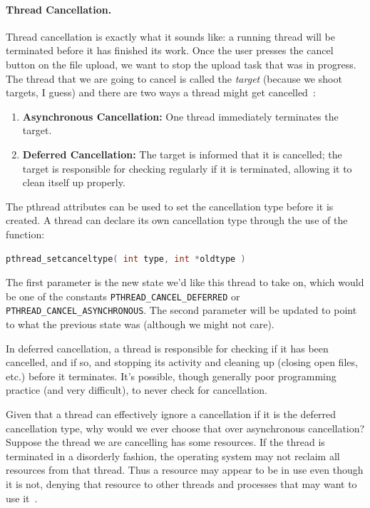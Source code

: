 \documentclass[a4paper]{report}
\begin{document}
\paragraph{Thread Cancellation.}
Thread cancellation is exactly what it sounds like: a running thread will be terminated before it has finished its work. Once the user presses the cancel button on the file upload, we want to stop the upload task that was in progress. The thread that we are going to cancel is called the \textit{target} (because we shoot targets, I guess) and there are two ways a thread might get cancelled~\cite{osc}:

\begin{enumerate}
	\item \textbf{Asynchronous Cancellation:} One thread immediately terminates the target.
	\item \textbf{Deferred Cancellation:} The target is informed that it is cancelled; the target is responsible for checking regularly if it is terminated, allowing it to clean itself up properly.
\end{enumerate}

The pthread attributes can be used to set the cancellation type before it is created. A thread can declare its own cancellation type through the use of the function:
\begin{lstlisting}[language=C]
pthread_setcanceltype( int type, int *oldtype )
\end{lstlisting}

The first parameter is the new state we'd like this thread to take on, which would be one of the constants \texttt{PTHREAD\_CANCEL\_DEFERRED} or \texttt{PTHREAD\_CANCEL\_ASYNCHRONOUS}. The second parameter will be updated to point to what the previous state was (although we might not care).

In deferred cancellation, a thread is responsible for checking if it has been cancelled, and if so, and stopping its activity and cleaning up (closing open files, etc.) before it terminates. It's possible, though generally poor programming practice (and very difficult), to never check for cancellation.

Given that a thread can effectively ignore a cancellation if it is the deferred cancellation type, why would we ever choose that over asynchronous cancellation? Suppose the thread we are cancelling has some resources. If the thread is terminated in a disorderly fashion, the operating system may not reclaim all resources from that thread. Thus a resource may appear to be in use even though it is not, denying that resource to other threads and processes that may want to use it~\cite{osc}.
\end{document}
